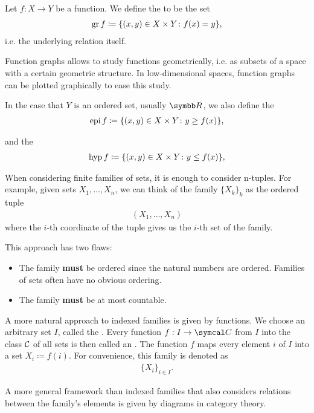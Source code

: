 \begin{definition}\label{def:function_graphs}
  Let $f: X \to Y$ be a function. We define the  to be the set
  \begin{align*}
    \operatorname{gr} f \coloneqq \{ (x, y) \in X \times Y \colon f(x) = y \},
  \end{align*}
  i.e. the underlying relation itself.

  Function graphs allows to study functions geometrically, i.e. as subsets of a space with a certain geometric structure. In low-dimensional spaces, function graphs can be plotted graphically to ease this study.

  In the case that $Y$ is an ordered set, usually $\BB{R}$, we also define the 
  \begin{align*}
    \operatorname{epi} f \coloneqq \{ (x, y) \in X \times Y \colon y \geq f(x) \},
  \end{align*}

  and the 
  \begin{align*}
    \operatorname{hyp} f \coloneqq \{ (x, y) \in X \times Y \colon y \leq f(x) \},
  \end{align*}
\end{definition}

\begin{definition}\label{def:indexed_family}
  When considering finite families of sets, it is enough to consider n-tuples. For example, given sets $X_1, \ldots, X_n$, we can think of the family $\{ X_k \}_k$ as the ordered tuple
  \begin{align*}
    (X_1, \ldots, X_n)
  \end{align*}
  where the $i$-th coordinate of the tuple gives us the $i$-th set of the family.

  This approach has two flaws:
  \begin{itemize}
    \item The family \textbf{must} be ordered since the natural numbers are ordered. Families of sets often have no obvious ordering.
    \item The family \textbf{must} be at most countable.
  \end{itemize}

  A more natural approach to indexed families is given by functions. We choose an arbitrary set $I$, called the . Every function $f: I \to \Cal C$ from $I$ into the class $\cal C$ of all sets is then called an . The function $f$ maps every element $i$ of $I$ into a set $X_i \coloneqq f(i)$. For convenience, this family is denoted as
  \begin{align*}
    \{ X_i \}_{i \in I}.
  \end{align*}

  A more general framework than indexed families that also considers relations between the family's elements is given by diagrams in category theory.
\end{definition}


